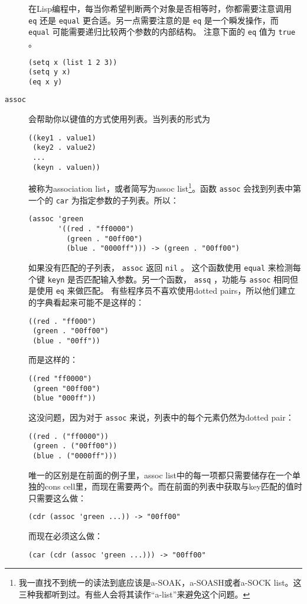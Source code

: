 \begin{description}
在Lisp编程中，每当你希望判断两个对象是否相等时，你都需要注意调用 \texttt{eq} 还是 \texttt{equal} 更合适。另一点需要注意的是 \texttt{eq} 是一个瞬发操作，而 \texttt{equal} 可能需要递归比较两个参数的内部结构。
注意下面的 \texttt{eq} 值为 \texttt{true} 。
\begin{verbatim}
(setq x (list 1 2 3))
(setq y x)
(eq x y)
\end{verbatim}
  \item[ \texttt{assoc} ] 会帮助你以键值的方式使用列表。当列表的形式为
\begin{verbatim}
((key1 . value1)
 (key2 . value2)
 ...
 (keyn . valuen))
\end{verbatim}
被称为association list，或者简写为assoc list\footnote{我一直找不到统一的读法到底应该是a-SOAK，a-SOASH或者a-SOCK list。这三种我都听到过。有些人会将其读作“a-list”来避免这个问题。}。函数 \texttt{assoc} 会找到列表中第一个的 \texttt{car} 为指定参数的子列表。所以：
\begin{verbatim}
(assoc 'green
       '((red . "ff0000")
         (green . "00ff00")
         (blue . "0000ff"))) -> (green . "00ff00")
\end{verbatim}
如果没有匹配的子列表， \texttt{assoc} 返回 \texttt{nil} 。
这个函数使用 \texttt{equal} 来检测每个键 \texttt{keyn} 是否匹配输入参数。另一个函数， \texttt{assq} ，功能与 \texttt{assoc} 相同但是使用 \texttt{eq} 来做匹配。
有些程序员不喜欢使用dotted pairs，所以他们建立的字典看起来可能不是这样的：
\begin{verbatim}
((red . "ff000")
 (green . "00ff00")
 (blue . "00ff"))
\end{verbatim}
而是这样的：
\begin{verbatim}
((red "ff0000")
 (green "00ff00")
 (blue "000ff"))
\end{verbatim}
这没问题，因为对于 \texttt{assoc} 来说，列表中的每个元素仍然为dotted pair：
\begin{verbatim}
((red . ("ff0000"))
 (green . ("00ff00"))
 (blue . ("0000ff")))
\end{verbatim}
唯一的区别是在前面的例子里，assoc list中的每一项都只需要储存在一个单独的cons cell里，而现在需要两个。而在前面的列表中获取与key匹配的值时只需要这么做：
\begin{verbatim}
(cdr (assoc 'green ...)) -> "00ff00"
\end{verbatim}
而现在必须这么做：
\begin{verbatim}
(car (cdr (assoc 'green ...))) -> "00ff00"
\end{verbatim}
\end{description}

